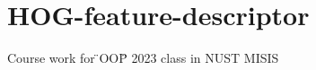 \chapter{HOG-\/feature-\/descriptor}
\hypertarget{md__r_e_a_d_m_e}{}\label{md__r_e_a_d_m_e}
\label{md__r_e_a_d_m_e_autotoc_md0}%
%
Course work for \"{}\+OOP\"{} 2023 class in NUST MISIS 